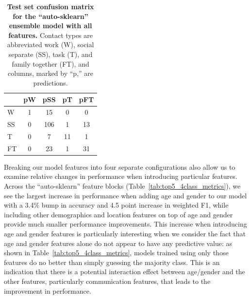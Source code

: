 \documentclass[acmlarge]{acmart}
\begin{document}
\begin{table}[h]
    \centering
        \begin{tabular}{lcccc}
        \toprule
        {} &  pW &  pSS &  pT &  pFT \\
        \midrule
        W            &       1 &        15 &       0 &                  0 \\
        SS          &       0 &       106 &       1 &                 13 \\
        T            &       0 &         7 &      11 &                  1 \\
        FT &       0 &        23 &       1 &                 31 \\
        \bottomrule
        \end{tabular}
        \caption{\textbf{Test set confusion matrix for the ``auto-sklearn'' ensemble model with all features.} Contact types are abbreviated work (W), social separate (SS), task (T), and family together (FT), and  columns, marked by ``p,'' are predictions.}
        \label{tab:top5_4class_confusion}
\end{table}

Breaking our model features into four separate configurations also allow us to examine relative changes in performance when introducing particular features. Across the ``auto-sklearn'' feature blocks (Table~\ref{tab:top5_4class_metrics}), we see the largest increase in performance when adding age and gender to our model with a 3.4\% bump in accuracy and 4.5 point increase in weighted F1, while including other demographics and location features on top of age and gender provide much smaller performance improvements. This increase when introducing age and gender features is particularly interesting when we consider the fact that age and gender features alone do not appear to have any predictive value: as shown in Table~\ref{tab:top5_4class_metrics}, models trained using only those features do no better than simply guessing the majority class. This is an indication that there is a potential interaction effect between age/gender and the other features, particularly communication features, that leads to the improvement in performance.
\end{document}
